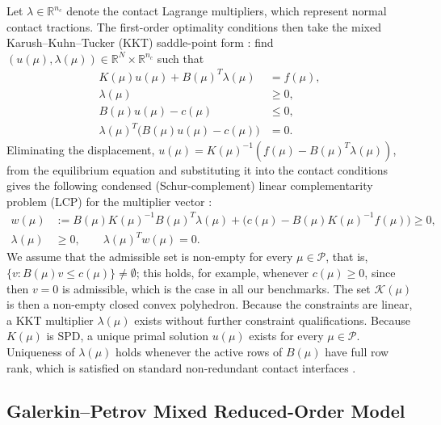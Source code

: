 \documentclass[11pt,a4paper]{article}
\begin{document}
Let \(\lambda \in \mathbb{R}^{n_c}\) denote the contact Lagrange multipliers, which represent normal contact tractions. The first-order optimality conditions then take the mixed Karush--Kuhn--Tucker (KKT) saddle-point form \cite{hild2007residual, banz2024generic}: find \((u(\mu), \lambda(\mu)) \in \mathbb{R}^N \times \mathbb{R}^{n_c}\) such that
\begin{equation}\label{eq:kkt}\begin{aligned}
K(\mu) u(\mu) + B(\mu)^T \lambda(\mu) &= f(\mu), \\
\lambda(\mu) &\ge 0, \\
B(\mu) u(\mu) - c(\mu) &\le 0, \\
\lambda(\mu)^T \bigl(B(\mu) u(\mu) - c(\mu)\bigr) &= 0.
\end{aligned}\end{equation}
Eliminating the displacement, \(u(\mu) = K(\mu)^{-1}(f(\mu) - B(\mu)^T \lambda(\mu))\), from the equilibrium equation and substituting it into the contact conditions gives the following condensed (Schur-complement) linear complementarity problem (LCP) for the multiplier vector \cite{balajewicz2016projection, leberre2022condition}:
\begin{equation}\label{eq:lcp}\begin{aligned}
w(\mu) &:= B(\mu) K(\mu)^{-1} B(\mu)^T \lambda(\mu) + \bigl(c(\mu) - B(\mu) K(\mu)^{-1} f(\mu)\bigr) \ge 0, \\
\lambda(\mu) &\ge 0, \qquad \lambda(\mu)^T w(\mu) = 0.
\end{aligned}\end{equation}
We assume that the admissible set is non-empty for every \(\mu \in \mathcal{P}\), that is, \(\{v : B(\mu) v \le c(\mu)\} \neq \emptyset\); this holds, for example, whenever \(c(\mu) \ge 0\), since then \(v = 0\) is admissible, which is the case in all our benchmarks. The set \(\mathcal{K}(\mu)\) is then a non-empty closed convex polyhedron. Because the constraints are linear, a KKT multiplier \(\lambda(\mu)\) exists without further constraint qualifications. Because \(K(\mu)\) is SPD, a unique primal solution \(u(\mu)\) exists for every \(\mu \in \mathcal{P}\). Uniqueness of \(\lambda(\mu)\) holds whenever the active rows of \(B(\mu)\) have full row rank, which is satisfied on standard non-redundant contact interfaces \cite{wohlmuth2011variationally, franceschini2022block}.

\hypertarget{galerkinpetrov-mixed-reduced-order-model}{%
\subsection{Galerkin--Petrov Mixed Reduced-Order Model}\label{galerkinpetrov-mixed-reduced-order-model}}
\end{document}
